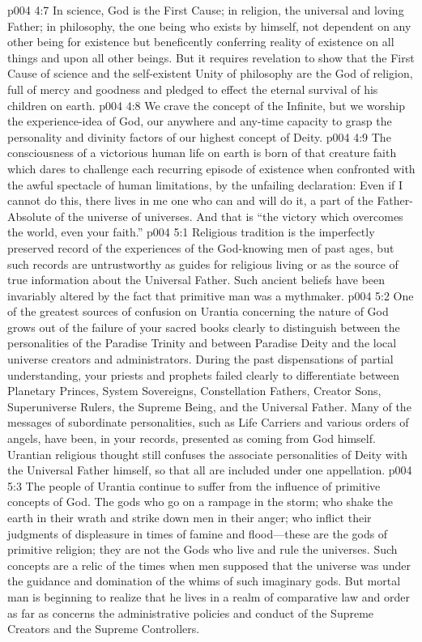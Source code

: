 \pc \vs p004 4:7 In science, God is the First Cause; in religion, the universal and loving Father; in philosophy, the one being who exists by himself, not dependent on any other being for existence but beneficently conferring reality of existence on all things and upon all other beings. But it requires revelation to show that the First Cause of science and the self\hyp{}existent Unity of philosophy are the God of religion, full of mercy and goodness and pledged to effect the eternal survival of his children on earth.
\vs p004 4:8 We crave the concept of the Infinite, but we worship the experience\hyp{}idea of God, our anywhere and any\hyp{}time capacity to grasp the personality and divinity factors of our highest concept of Deity.
\vs p004 4:9 The consciousness of a victorious human life on earth is born of that creature faith which dares to challenge each recurring episode of existence when confronted with the awful spectacle of human limitations, by the unfailing declaration: Even if I cannot do this, there lives in me one who can and will do it, a part of the Father\hyp{}Absolute of the universe of universes. And that is “the victory which overcomes the world, even your faith.”\plusone
{}
\vs p004 5:1 Religious tradition is the imperfectly preserved record of the experiences of the God\hyp{}knowing men of past ages, but such records are untrustworthy as guides for religious living or as the source of true information about the Universal Father. Such ancient beliefs have been invariably altered by the fact that primitive man was a mythmaker.
\vs p004 5:2 One of the greatest sources of confusion on Urantia concerning the nature of God grows out of the failure of your sacred books clearly to distinguish between the personalities of the Paradise Trinity and between Paradise Deity and the local universe creators and administrators. During the past dispensations of partial understanding, your priests and prophets failed clearly to differentiate between Planetary Princes, System Sovereigns, Constellation Fathers, Creator Sons, Superuniverse Rulers, the Supreme Being, and the Universal Father. Many of the messages of subordinate personalities, such as Life Carriers and various orders of angels, have been, in your records, presented as coming from God himself. Urantian religious thought still confuses the associate personalities of Deity with the Universal Father himself, so that all are included under one appellation.
\pc \vs p004 5:3 The people of Urantia continue to suffer from the influence of primitive concepts of God. The gods who go on a rampage in the storm; who shake the earth in their wrath and strike down men in their anger; who inflict their judgments of displeasure in times of famine and flood---these are the gods of primitive religion; they are not the Gods who live and rule the universes. Such concepts are a relic of the times when men supposed that the universe was under the guidance and domination of the whims of such imaginary gods. But mortal man is beginning to realize that he lives in a realm of comparative law and order as far as concerns the administrative policies and conduct of the Supreme Creators and the Supreme Controllers.
